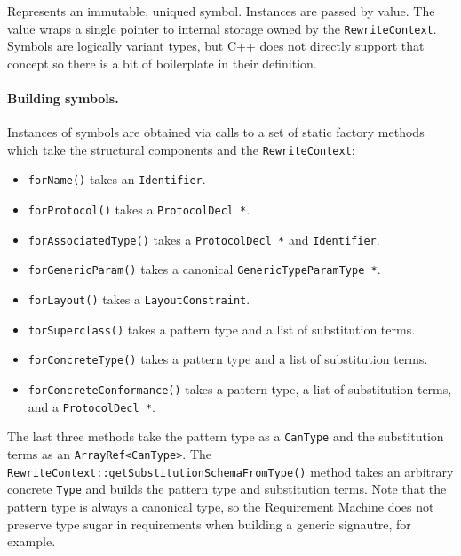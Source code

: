 \documentclass[../generics]{subfiles}
\begin{document}
Represents an immutable, uniqued symbol. Instances are passed by value. The value wraps a single pointer to internal storage owned by the \texttt{RewriteContext}. Symbols are logically variant types, but C++ does not directly support that concept so there is a bit of boilerplate in their definition.

\paragraph{Building symbols.}
Instances of symbols are obtained via calls to a set of static factory methods which take the structural components and the \texttt{RewriteContext}:
\begin{itemize}
\item \texttt{forName()} takes an \texttt{Identifier}.
\item \texttt{forProtocol()} takes a \texttt{ProtocolDecl *}.
\item \texttt{forAssociatedType()} takes a \texttt{ProtocolDecl *} and \texttt{Identifier}.
\item \texttt{forGenericParam()} takes a canonical \texttt{GenericTypeParamType *}.
\item \texttt{forLayout()} takes a \texttt{LayoutConstraint}.
\item \texttt{forSuperclass()} takes a pattern type and a list of substitution terms.
\item \texttt{forConcreteType()} takes a pattern type and a list of substitution terms.
\item \texttt{forConcreteConformance()} takes a pattern type, a list of substitution terms, and a \texttt{ProtocolDecl *}.
\end{itemize}
The last three methods take the pattern type as a \texttt{CanType} and the substitution terms as an \texttt{ArrayRef<CanType>}. The \texttt{RewriteContext::getSubstitutionSchemaFromType()} method takes an arbitrary concrete \texttt{Type} and builds the pattern type and substitution terms. Note that the pattern type is always a canonical type, so the Requirement Machine does not preserve type sugar in requirements when building a generic signautre, for example.
\end{document}
